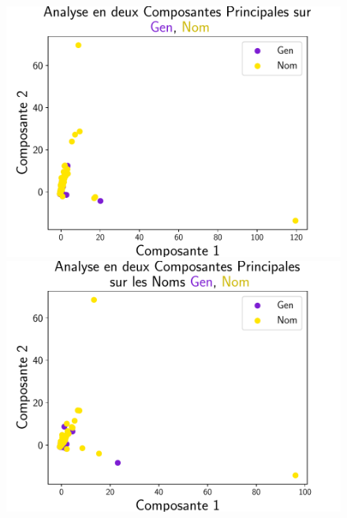 \documentclass{cours}
\begin{document}
\begin{figure}[H]
	\begin{center}
	\begin{minipage}{.5\textwidth}
	\begin{center}
	\includegraphics[width=\linewidth]{Figures/Visualisations/pca_Gen_Nom}
	\end{center}
	\end{minipage}
	\end{center}
	\begin{minipage}{.5\textwidth}
	\begin{center}
	\includegraphics[width=\linewidth]{Figures/Visualisations/pca_Gen_Nom_Nouns}
	\end{center}

\end{minipage}
\end{figure}
\end{document}
